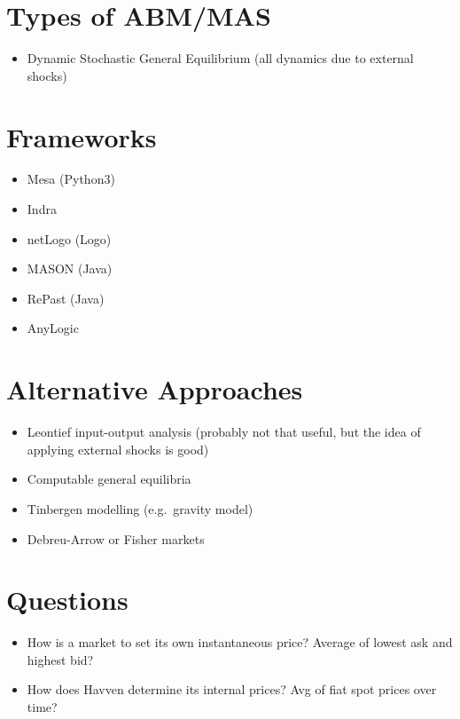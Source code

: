 \documentclass{article}
\begin{document}
\section{Types of ABM/MAS}
\begin{itemize}
    \item Dynamic Stochastic General Equilibrium (all dynamics due to external shocks)
\end{itemize}

\section{Frameworks}

\begin{itemize}
    \item Mesa (Python3)
    \item Indra
    \item netLogo (Logo)
    \item MASON (Java)
    \item RePast (Java)
    \item AnyLogic
\end{itemize}

\section{Alternative Approaches}
\begin{itemize}
    \item Leontief input-output analysis (probably not that useful, but the idea of applying external shocks is good)
    \item Computable general equilibria
    \item Tinbergen modelling (e.g.\ gravity model)
    \item Debreu-Arrow or Fisher markets
\end{itemize}

\section{Questions}

\begin{itemize}
    \item How is a market to set its own instantaneous price? Average of lowest ask and highest bid?
    \item How does Havven determine its internal prices? Avg of fiat spot prices over time?
\end{itemize}
\end{document}
